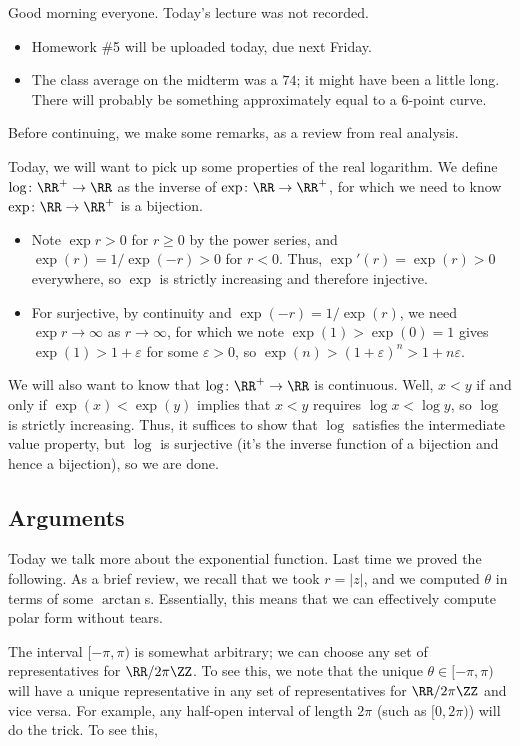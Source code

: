 \documentclass[../notes.tex]{subfiles}
\begin{document}

Good morning everyone. Today's lecture was not recorded.
\begin{itemize}
	\item Homework \#5 will be uploaded today, due next Friday.
	\item The class average on the midterm was a $74$; it might have been a little long. There will probably be something approximately equal to a $6$-point curve.
\end{itemize}
Before continuing, we make some remarks, as a review from real analysis.
\begin{remark}[Nir]
	Today, we will want to pick up some properties of the real logarithm. We define $\log\colon \RR^+\to\RR$ as the inverse of $\exp\colon \RR\to\RR^+$, for which we need to know $\exp\colon \RR\to\RR^+$ is a bijection.
	\begin{itemize}
		\item Note $\exp r>0$ for $r\ge0$ by the power series, and $\exp(r)=1/\exp(-r)>0$ for $r<0$. Thus, $\exp'(r)=\exp(r)>0$ everywhere, so $\exp$ is strictly increasing and therefore injective.
		\item For surjective, by continuity and $\exp(-r)=1/\exp(r)$, we need $\exp r\to\infty$ as $r\to\infty$, for which we note $\exp(1)>\exp(0)=1$ gives $\exp(1)>1+\varepsilon$ for some $\varepsilon>0$, so $\exp(n)>(1+\varepsilon)^n>1+n\varepsilon$.
	\end{itemize}
\end{remark}
\begin{remark}[Nir]
	We will also want to know that $\log\colon \RR^+\to\RR$ is continuous. Well, $x<y$ if and only if $\exp(x)<\exp(y)$ implies that $x<y$ requires $\log x<\log y$, so $\log$ is strictly increasing. Thus, it suffices to show that $\log$ satisfies the intermediate value property, but $\log$ is surjective (it's the inverse function of a bijection and hence a bijection), so we are done.
\end{remark}

\subsection{Arguments}
Today we talk more about the exponential function. Last time we proved the following.
\polarform*
\noindent As a brief review, we recall that we took $r=|z|$, and we computed $\theta$ in terms of some $\arctan$s. Essentially, this means that we can effectively compute polar form without tears.
\begin{remark}
	The interval $[-\pi,\pi)$ is somewhat arbitrary; we can choose any set of representatives for $\RR/2\pi\ZZ$. To see this, we note that the unique $\theta\in[-\pi,\pi)$ will have a unique representative in any set of representatives for $\RR/2\pi\ZZ$ and vice versa. For example, any half-open interval of length $2\pi$ (such as $[0,2\pi)$) will do the trick. To see this, 
\end{remark}
\end{document}
